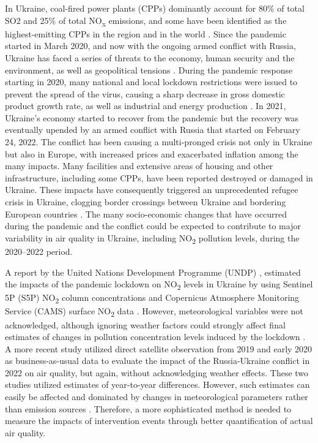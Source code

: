 In Ukraine, coal-fired power plants (CPPs) dominantly account for 80\% of total SO2 and 25\% of total NO\textsubscript{x} emissions, and some have been identified as the highest-emitting CPPs in the region and in the world \citep{lauri2021}. Since the pandemic started in March 2020, and now with the ongoing armed conflict with Russia, Ukraine has faced a series of threats to the economy, human security and the environment, as well as geopolitical tensions \citep{pereira2022russian}. During the pandemic response starting in 2020, many national and local lockdown restrictions were issued to prevent the spread of the virus, causing a sharp decrease in gross domestic product growth rate, as well as industrial and energy production \citep{danylyshyn2020peculiarities}. In 2021, Ukraine’s economy started to recover from the pandemic but the recovery was eventually upended by an armed conflict with Russia that started on February 24, 2022. The conflict has been causing a multi-pronged crisis not only in Ukraine but also in Europe, with increased prices and exacerbated inflation among the many impacts. Many facilities and extensive areas of housing and other infrastructure, including some CPPs, have been reported destroyed or damaged in Ukraine. These impacts have consequently triggered an unprecedented refugee crisis in Ukraine, clogging border crossings between Ukraine and bordering European countries \citep{julia2022}. The many socio-economic changes that have occurred during the pandemic and the conflict could be expected to contribute to major variability in air quality in Ukraine, including NO\textsubscript{2} pollution levels, during the 2020–2022 period. \par
A report by the United Nations Development Programme (UNDP) \citep{dumitru2020}, estimated the impacts of the pandemic lockdown on NO\textsubscript{2} levels in Ukraine by using Sentinel 5P (S5P) NO\textsubscript{2} column concentrations and Copernicus Atmosphere Monitoring Service (CAMS) surface NO\textsubscript{2} data \citep{marecal2015regional}. However, meteorological variables were not acknowledged, although ignoring weather factors could strongly affect final estimates of changes in pollution concentration levels induced by the lockdown \citep{schiermeier2020pollution}. A more recent study \citep{zalakeviciute2022war} utilized direct satellite observation from 2019 and early 2020 as business-as-usual data to evaluate the impact of the Russia-Ukraine conflict in 2022 on air quality, but again, without acknowledging weather effects. These two studies utilized estimates of year-to-year differences. However, such estimates can easily be affected and dominated by changes in meteorological parameters rather than emission sources \citep{grange2021covid,shi2021abrupt}. Therefore, a more sophisticated method is needed to measure the impacts of intervention events through better quantification of actual air quality. \par
